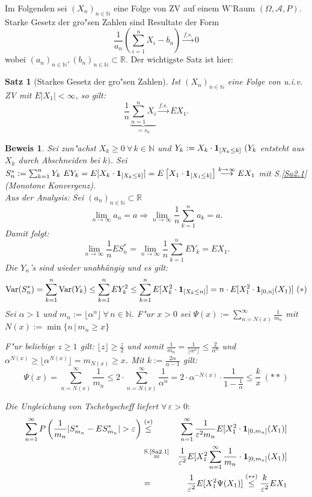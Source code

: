 \documentclass[a4paper,11pt]{scrbook}
\newcommand{\R}{{\mathbb R}}
\newcommand{\N}{{\mathbb N}}
\newcommand{\ind}{\text{\bf{1}}}
\newcommand{\eps}{\varepsilon}
\DeclareMathOperator{\var}{Var}
\def\AA{ \mathcal{A} }
\def\fs{\stackrel{f.s.}{\rightarrow }}
\newtheorem{Sa}{Satz}[chapter]
\theoremstyle{nonumberplain}
\newtheorem{Bew}{Beweis}
\begin{document}
Im Folgenden sei $(X_n)_{n \in \N}$ eine Folge von ZV auf einem W'Raum $(\Omega,\AA,P)$. Starke Gesetz der gro"sen Zahlen sind Resultate der Form
\[
\frac1{a_n} \left( \sum_{i = 1}^{n} X_i -b_n \right) \fs 0
\]
wobei $(a_n)_{n \in \N}, (b_n)_{n \in \N} \subset \R$. Der wichtigste Satz ist hier:

\begin{Sa}[Starkes Gesetz der gro"sen Zahlen] \label{Sa4.2}
Ist $(X_n)_{n \in \N}$ eine Folge von u.i.v. ZV mit $E|X_1| < \infty$, so gilt:
\[
\frac1{n} \underbrace{\sum_{n=1}^n X_i}_{=s_n} \fs EX_1.
\]
\end{Sa}

\begin{Bew}
Sei zun"achst $X_k \geq 0\ \forall\, k \in \N$ und $Y_k := X_k \cdot \ind_{[X_k \leq k]}\ (Y_k$ entsteht aus $X_k$ durch Abschneiden bei $k)$. Sei $S_n^{\ast} := \sum_{k=1}^n Y_k\ EY_k = E[X_k \cdot \ind_{[X_k \leq k]}] = E\left[X_1 \cdot \ind_{[X_1 \leq k]}\right] \stackrel{k \rightarrow \infty}{\longrightarrow} EX_1$ mit S.\ref{Sa2.1} (Monotone Konvergenz).\\
Aus der Analysis: Sei $(a_n)_{n \in \N} \subset \R$
\[
\lim_{n \rightarrow \infty} a_n = a \Rightarrow \lim_{n \rightarrow \infty} \frac1{n} \sum_{k=1}^n a_k = a.
\]
Damit folgt:
\[
\lim_{n \rightarrow \infty} \frac1{n} E S_n^{\ast} = \lim_{n \rightarrow \infty} \frac1{n} \sum_{k=1}^n E Y_k = E X_1.
\]
Die $Y_n$'s sind wieder unabhängig und es gilt:
\[
\var(S_n^{\ast}) = \sum_{k=1}^n \var(Y_k) \leq \sum_{k=1}^n EY_k^2 \leq \sum_{k=1}^n E[X_k^2 \cdot \ind_{[X_k \leq n]}] = n \cdot E[X_1^2 \cdot \ind_{[0,n]}(X_1)] \ (\ast)
\]
Sei $\alpha > 1$ und $m_n := \lfloor \alpha^n \rfloor \ \forall\, n \in \N$. F"ur $x > 0$ sei $\Psi(x) := \sum_{n = N(x)}^{\infty} \frac1{m_n}$ mit $N(x) := \min\{ n \, | \, m_n \geq x \}$

F"ur beliebige $z \geq 1$ gilt: $\lfloor z \rfloor \geq \frac{z}2$ und somit $\frac1{m_n} = \frac1{\lfloor \alpha^n \rfloor} \leq \frac2{\alpha^n}$ und $\alpha^{N(x)} \geq \lfloor \alpha^{N(x)} \rfloor = m_{N(x)} \geq x$. Mit $k := \frac{2\alpha}{\alpha-1}$ gilt:
\[
\Psi(x) = \sum_{n=N(x)}^{\infty} \frac1{m_n} \leq 2 \cdot \sum_{n=N(x)}^{\infty} \frac1{\alpha^n} = 2 \cdot \alpha^{-N(x)} \cdot \frac1{1-\frac1{\alpha}} \leq \frac{k}{x} \ (\ast \ast)
\]

Die Ungleichung von Tschebyscheff liefert $\forall\, \eps > 0:$
\begin{eqnarray*}
\sum_{n=1}^{\infty} P\left( \frac1{m_n} | S_{m_n}^{\ast} - E S_{m_n}^{\ast} | > \eps \right) & \stackrel{(\ast)}{\leq} & \sum_{n=1}^{\infty} \frac1{\eps^2 m_n} E[X_1^2 \cdot \ind_{[0,m_n]}(X_1)] \\
& \stackrel{\text{S.\ref{Sa2.1}}}{=} & \frac1{\eps^2} E[X_1^2 \sum_{n=1}^{\infty} \frac1{m_n} \cdot \ind_{[0,m_x]}(X_1)]\\
& = & \frac1{\eps^2} E[X_1^2 \Psi(X_1)] \stackrel{(\ast \ast)}{\leq} \frac{k}{\eps^2} EX_1
\end{eqnarray*}


\end{Bew}
\end{document}
